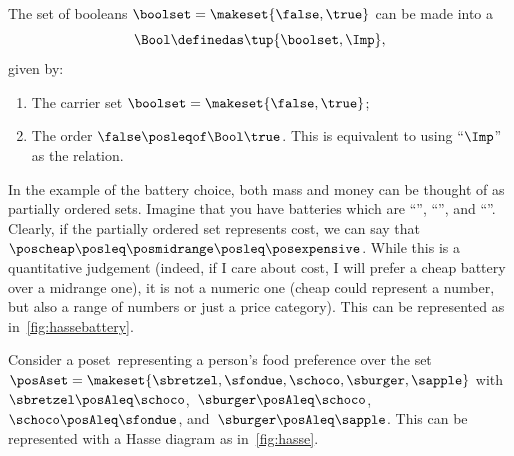 \begin{definition}
    \label{def:bool-poset}
    The set of booleans $\boolset = \makeset{\false, \true}$ can be made into a 
    \begin{equation}
        \label{eq:bool-poset}
        \Bool \definedas \tup{\boolset, {{\Imp}}},
    \end{equation}
    given by:

    \constit
    \begin{enumerate}
        \item The carrier set $\boolset = \makeset{\false, \true}$;
        \item The order $\false \posleqof\Bool \true$. This is equivalent to using ``$\Imp$'' as the relation.
    \end{enumerate}
\end{definition}

\vspace{1cm}
\begin{marginfigure}[4mm]
    \centering
    \caption{Possible costs of a battery, represented as a poset.
    }
    \label{fig:hassebattery}
\end{marginfigure}
%
\begin{example}
    In the example of the battery choice, both mass and money can be thought of as partially ordered sets.
    Imagine that you have batteries which are ``\poscheap'', ``\posmidrange'', and ``\posexpensive''.
    Clearly, if the partially ordered set represents cost, we can say that~$\poscheap \posleq\posmidrange \posleq\posexpensive$.
    While this is a quantitative judgement (indeed, if I care about cost, I will prefer a cheap battery over a midrange one), it is not a numeric one (cheap could represent a number, but also a range of numbers or just a price category).
    This can be represented as in~\cref{fig:hassebattery}.
\end{example}

\vspace{1cm}
\begin{marginfigure}[4mm]
    \centering
    \caption{Example of Hasse diagram of~\posA.}
    \label{fig:hasse}
\end{marginfigure}
\begin{example}
    Consider a poset~\posA representing a person's food preference over the set~$\posAset=\makeset{\sbretzel,\sfondue,\schoco,\sburger,\sapple}$ with~$\sbretzel\posAleq \schoco$,~$\sburger\posAleq \schoco$,~$\schoco\posAleq \sfondue$, and~$\sburger\posAleq \sapple$.
    This can be represented with a Hasse diagram as in~\cref{fig:hasse}.
\end{example}


